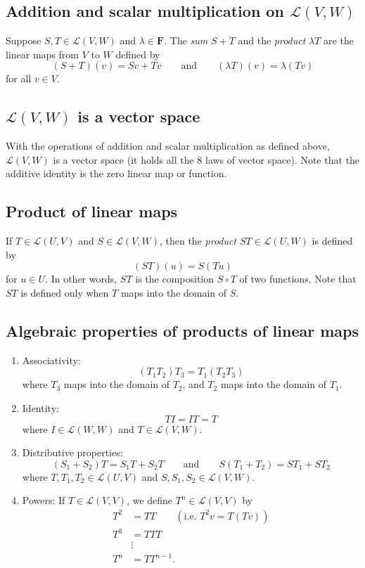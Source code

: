 \documentclass[11pt]{article}
\begin{document}
    \subsection{Addition and scalar multiplication on \(\mathcal{L}(V,W)\) }

    Suppose $S,T \in \mathcal{L}(V,W)$ and \(\lambda \in \textbf{F}\). The \emph{sum} \(S + T\) and the \emph{product} \(\lambda T\) are the linear maps from $V$ to $W$ defined by \[(S+T)(v) = Sv + Tv \qquad \text{and} \qquad (\lambda T)(v) = \lambda (Tv)\] for all \(v \in V\).

    \subsection{\(\mathcal{L}(V,W)\) is a vector space}

    With the operations of addition and scalar multiplication as defined above, \(\mathcal{L}(V,W)\) is a vector space (it holds all the 8 laws of vector space). Note that the additive identity is the zero linear map or function. 

    \subsection{Product of linear maps}

    If \(T \in \mathcal{L}(U,V)\) and \(S \in \mathcal{L}(V,W)\), then the \emph{product} \(ST \in \mathcal{L}(U,W)\) is defined by \[(ST)(u) = S(Tu)\] for \(u \in U\). In other words, $ST$ is the composition \(S \circ T\) of two functions. Note that $ST$ is defined only when $T$ maps into the domain of $S$.

    \subsection{Algebraic properties of products of linear maps}

    \begin{enumerate}
        \item Associativity: \[(T_1 T_2)T_3 = T_1 (T_2 T_3)\] where \(T_3\) maps into the domain of \(T_2\), and \(T_2\) maps into the domain of \(T_1\). 
        \item Identity: \[TI = IT = T\] where \(I \in \mathcal{L}(W,W)\) and \(T \in \mathcal{L}(V,W)\). 
        \item Distributive properties: \[(S_1 + S_2)T = S_1 T + S_2 T \qquad \text{and} \qquad S(T_1 + T_2) = ST_1 + ST_2\] where \(T, T_1, T_2 \in \mathcal{L}(U,V)\) and \(S,S_1,S_2 \in \mathcal{L}(V,W)\). 
        \item Powers: If \(T \in \mathcal{L}(V,V)\), we define \(T^n \in \mathcal{L}(V,V)\) by 
        \begin{align*}
            T^2 &= TT \qquad (\text{i.e. } T^2 v = T(Tv))\\
            T^3 &= TTT \\
            &\vdots \\
            T^n &= TT^{n-1}.
        \end{align*}
    \end{enumerate}
\end{document}
